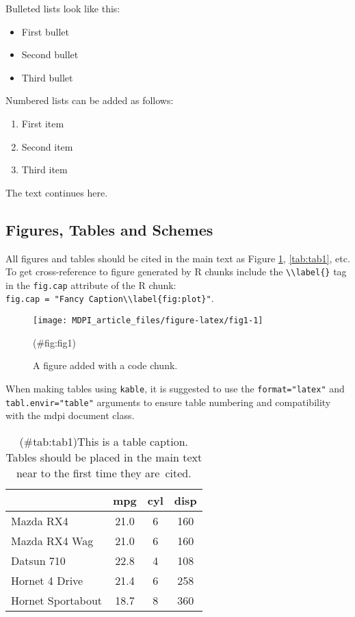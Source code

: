 \documentclass[
]{article}
\providecommand{\tightlist}{%
  \setlength{\itemsep}{0pt}\setlength{\parskip}{0pt}}
\begin{document}
Bulleted lists look like this:

\begin{itemize}
\tightlist
\item
  First bullet
\item
  Second bullet
\item
  Third bullet
\end{itemize}

Numbered lists can be added as follows:

\begin{enumerate}
\def\labelenumi{\arabic{enumi}.}
\tightlist
\item
  First item
\item
  Second item
\item
  Third item
\end{enumerate}

The text continues here.

\hypertarget{figures-tables-and-schemes}{%
\subsection{Figures, Tables and Schemes}\label{figures-tables-and-schemes}}

All figures and tables should be cited in the main text as Figure \ref{fig:fig1},
\ref{tab:tab1}, etc. To get cross-reference to figure generated by R chunks
include the \texttt{\textbackslash{}\textbackslash{}label\{\}} tag in the \texttt{fig.cap} attribute of the R chunk:
\texttt{fig.cap\ =\ "Fancy\ Caption\textbackslash{}\textbackslash{}label\{fig:plot\}"}.

\begin{figure}[h!]

{\centering \texttt{[image: MDPI\_article\_files/figure-latex/fig1-1]} 

}

\caption{A figure added with a code chunk.\label{fig:fig1}}(\#fig:fig1)
\end{figure}

When making tables using \texttt{kable}, it is suggested to use
the \texttt{format="latex"} and \texttt{tabl.envir="table"} arguments
to ensure table numbering and compatibility with the mdpi
document class.

\begin{table}[H]

\caption{(\#tab:tab1)This is a table caption. Tables should be placed in the 
             main text near to the first time they are~cited.}
\begin{tabular}[t]{lccc}
\toprule
  & mpg & cyl & disp\\
\midrule
Mazda RX4 & 21.0 & 6 & 160\\
Mazda RX4 Wag & 21.0 & 6 & 160\\
Datsun 710 & 22.8 & 4 & 108\\
Hornet 4 Drive & 21.4 & 6 & 258\\
Hornet Sportabout & 18.7 & 8 & 360\\
\bottomrule
\end{tabular}
\end{table}
\end{document}
